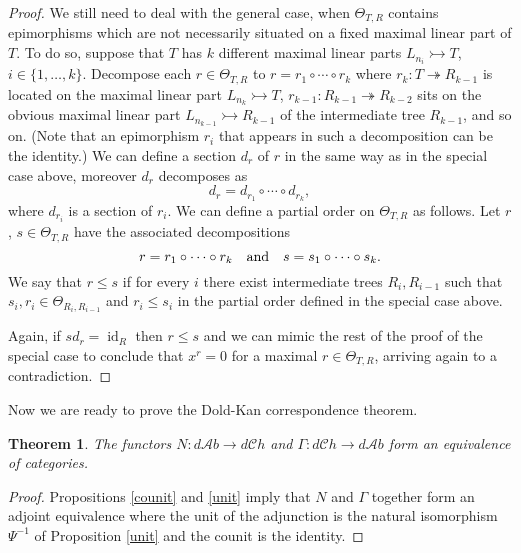 \documentclass[a4paper]{amsart}
\theoremstyle{plain}
\newtheorem{thm}{Theorem}[section]
\theoremstyle{definition}
\theoremstyle{remark}
\DeclareMathOperator{\id}{id}
\newcommand{\To}{\longrightarrow}
\newcommand{\dCh}{d\mathcal{C}h}
\newcommand{\dAb}{d\mathcal{A}b}
\newcommand{\X}{\Theta}
\numberwithin{equation}{section}
\numberwithin{figure}{section}
\begin{document}
\begin{proof}
    We still need to deal with the general case, when $\X_{T,R}$ contains epimorphisms which are not necessarily situated on a fixed maximal linear part of $T$. To do so, suppose that $T$ has $k$ different maximal linear parts $L_{n_i}\rightarrowtail T$, $i\in\{1,\ldots,k\}$. Decompose each $r\in \X_{T,R}$ to $r=r_1\circ\cdots\circ r_k$ where $r_k\colon T\twoheadrightarrow R_{k-1}$ is located on the maximal linear part $L_{n_k}\rightarrowtail T$, $r_{k-1}\colon R_{k-1}\twoheadrightarrow R_{k-2}$ sits on the obvious maximal linear part $L_{n_{k-1}}\rightarrowtail R_{k-1}$ of the intermediate tree $R_{k-1}$, and so on. (Note that an epimorphism $r_i$ that appears in such a decomposition can be the identity.) We  can define a section $d_r$ of $r$ in the same way as in the special case above, moreover $d_r$ decomposes as
    \[
        d_r=d_{r_1}\circ\cdots \circ d_{r_k},
    \]
    where $d_{r_i}$ is a section of $r_i$. We can define a partial order on $\X_{T,R}$ as follows. Let $r$, $s\in \X_{T,R}$ have the associated decompositions
    \[
        r=r_1\circ\cdots \circ r_k \quad\textnormal{and}\quad s=s_1\circ\cdots \circ s_k.
    \]
    We say that $r\le s$ if for every $i$ there exist intermediate trees $R_i, R_{i-1}$ such that $s_i, r_i\in \X_{R_i,R_{i-1}}$ and $r_i\le s_i$ in the partial order defined in the special case above.

    Again, if $sd_r=\id_R$ then $r\le s$ and we can mimic the rest of the proof of the special case to conclude that $x^r=0$ for a maximal $r\in \X_{T,R}$, arriving again to a contradiction.
\end{proof}

Now we are ready to prove the Dold-Kan correspondence theorem.

\begin{thm}\label{dold kan}
    The functors $N\colon \dAb\To \dCh$ and $\Gamma\colon\dCh\To \dAb$ form an equivalence of categories.
\end{thm}
\begin{proof}
    Propositions \ref{counit} and \ref{unit} imply that $N$ and $\Gamma$ together form an adjoint equivalence where the unit of the adjunction is the natural isomorphism $\Psi^{-1}$ of Proposition \ref{unit} and the counit is the
    identity.
\end{proof}
\end{document}
